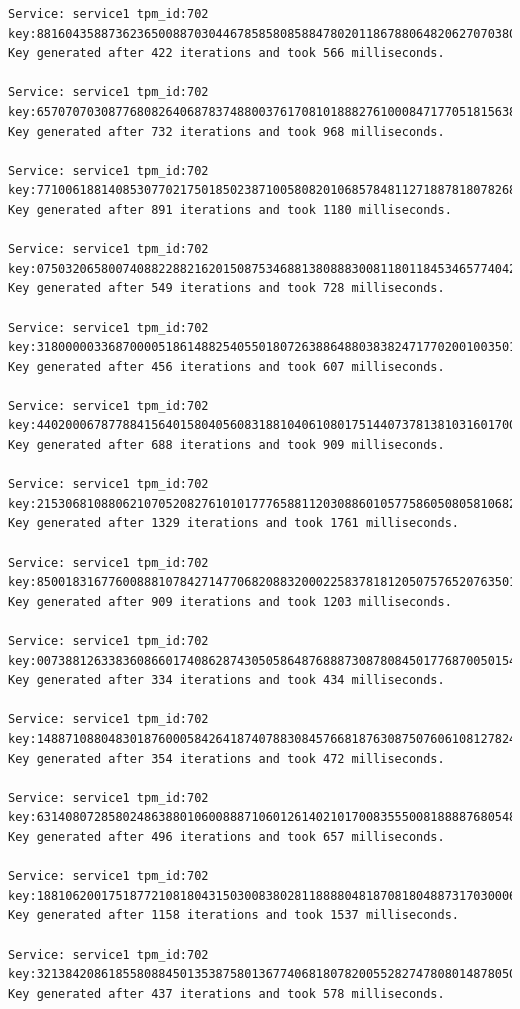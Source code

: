 \begin{lstlisting}
Service: service1 tpm_id:702 key:881604358873623650088703044678585808588478020118678806482062707038007883
Key generated after 422 iterations and took 566 milliseconds.

Service: service1 tpm_id:702 key:657070703087768082640687837488003761708101888276100084717705181563810850
Key generated after 732 iterations and took 968 milliseconds.

Service: service1 tpm_id:702 key:771006188140853077021750185023871005808201068578481127188781807826871150
Key generated after 891 iterations and took 1180 milliseconds.

Service: service1 tpm_id:702 key:075032065800740882288216201508753468813808883008118011845346577404280885
Key generated after 549 iterations and took 728 milliseconds.

Service: service1 tpm_id:702 key:318000003368700005186148825405501807263886488038382471770200100350107835
Key generated after 456 iterations and took 607 milliseconds.

Service: service1 tpm_id:702 key:440200067877884156401580405608318810406108017514407378138103160170083672
Key generated after 688 iterations and took 909 milliseconds.

Service: service1 tpm_id:702 key:215306810880621070520827610101777658811203088601057758605080581068280106
Key generated after 1329 iterations and took 1761 milliseconds.

Service: service1 tpm_id:702 key:850018316776008881078427147706820883200022583781812050757652076350150162
Key generated after 909 iterations and took 1203 milliseconds.

Service: service1 tpm_id:702 key:007388126338360866017408628743050586487688873087808450177687005015401188
Key generated after 334 iterations and took 434 milliseconds.

Service: service1 tpm_id:702 key:148871088048301876000584264187407883084576681876308750760610812782407365
Key generated after 354 iterations and took 472 milliseconds.

Service: service1 tpm_id:702 key:631408072858024863880106008887106012614021017008355500818888768054831008
Key generated after 496 iterations and took 657 milliseconds.

Service: service1 tpm_id:702 key:188106200175187721081804315030083802811888804818708180488731703000680486
Key generated after 1158 iterations and took 1537 milliseconds.

Service: service1 tpm_id:702 key:321384208618558088450135387580136774068180782005528274780801487805081678
Key generated after 437 iterations and took 578 milliseconds.


\end{lstlisting}

